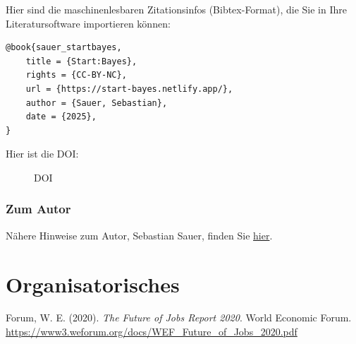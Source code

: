 \documentclass[
  ngerman,
  letterpaper,
]{scrbook}
\makeatletter
\newcommand*\pandocbounded[1]{%
  \sbox\pandoc@box{#1}%
  \Gscale@div\@tempa{\textheight}{\dimexpr\ht\pandoc@box+\dp\pandoc@box\relax}%
  \Gscale@div\@tempb{\linewidth}{\wd\pandoc@box}%
  \ifdim\@tempb\p@<\@tempa\p@\let\@tempa\@tempb\fi%
  \ifdim\@tempa\p@<\p@\scalebox{\@tempa}{\usebox\pandoc@box}%
  \else\usebox{\pandoc@box}%
  \fi%
}
\newlength{\cslhangindent}
\newenvironment{CSLReferences}[2] %
 {\begin{list}{}{%
  \setlength{\itemindent}{0pt}
  \setlength{\leftmargin}{0pt}
  \setlength{\parsep}{0pt}
  \ifodd #1
   \setlength{\leftmargin}{\cslhangindent}
   \setlength{\itemindent}{-1\cslhangindent}
  \fi
  \setlength{\itemsep}{#2\baselineskip}}}
 {\end{list}}
\makeatother
\begin{document}
Hier sind die maschinenlesbaren Zitationsinfos (Bibtex-Format), die Sie
in Ihre Literatursoftware importieren können:

\begin{verbatim}
@book{sauer_startbayes,
    title = {Start:Bayes},
    rights = {CC-BY-NC},
    url = {https://start-bayes.netlify.app/},
    author = {Sauer, Sebastian},
    date = {2025},
}
\end{verbatim}

Hier ist die DOI:

\begin{figure}[H]

{\centering \pandocbounded{}

}

\caption{DOI}

\end{figure}%

\section{Zum Autor}\label{zum-autor}

Nähere Hinweise zum Autor, Sebastian Sauer, finden Sie
\href{https://sebastiansauer-academic.netlify.app/}{hier}.

\part{Organisatorisches}

\label{refs}
\begin{CSLReferences}{1}{0}
Forum, W. E. (2020). \emph{The {Future} of {Jobs Report} 2020}. World
Economic Forum.
\url{https://www3.weforum.org/docs/WEF_Future_of_Jobs_2020.pdf}

\end{CSLReferences}


\backmatter
\end{document}
